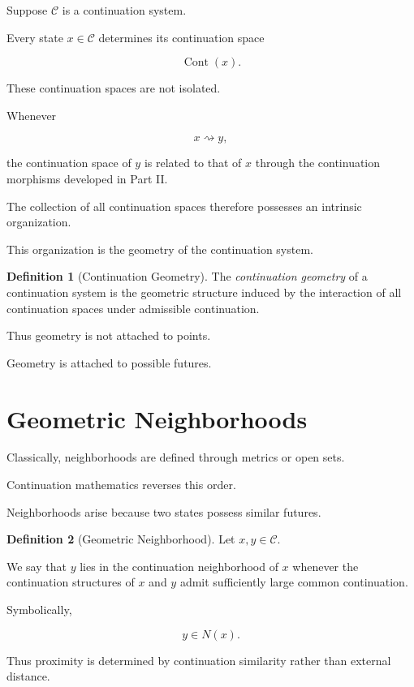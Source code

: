 \documentclass[13pt,openany]{book}
\theoremstyle{plain}
\theoremstyle{definition}
\newtheorem{definition}{Definition}[chapter]
\begin{document}
Suppose $\mathcal C$ is a continuation system.

Every state $x\in\mathcal C$ determines its continuation space

\[
\operatorname{Cont}(x).
\]

These continuation spaces are not isolated.

Whenever

\[
x\rightsquigarrow y,
\]

the continuation space of $y$ is related to that of $x$ through the continuation morphisms developed in Part II.

The collection of all continuation spaces therefore possesses an intrinsic organization.

This organization is the geometry of the continuation system.

\begin{definition}[Continuation Geometry]
The \emph{continuation geometry} of a continuation system is the geometric structure induced by the interaction of all continuation spaces under admissible continuation.
\end{definition}

Thus geometry is not attached to points.

Geometry is attached to possible futures.


\section{Geometric Neighborhoods}

Classically, neighborhoods are defined through metrics or open sets.

Continuation mathematics reverses this order.

Neighborhoods arise because two states possess similar futures.

\begin{definition}[Geometric Neighborhood]
Let $x,y\in\mathcal C$.

We say that $y$ lies in the continuation neighborhood of $x$ whenever the continuation structures of $x$ and $y$ admit sufficiently large common continuation.

Symbolically,

\[
y\in N(x).
\]

\end{definition}

Thus proximity is determined by continuation similarity rather than external distance.
\end{document}
